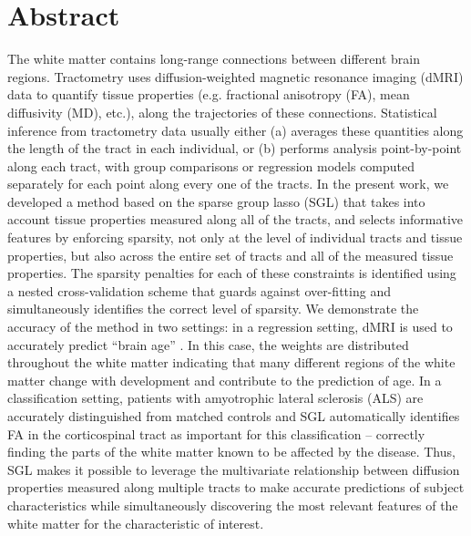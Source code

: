 \section*{Abstract}

The white matter contains long-range connections between different
brain regions. Tractometry uses diffusion-weighted magnetic resonance
imaging (dMRI) data to quantify tissue properties (e.g. fractional
anisotropy (FA), mean diffusivity (MD), etc.), along the trajectories
of these connections\cite{yeatman2012tract}. Statistical inference from
tractometry data usually either (a) averages these quantities along
the length of the tract in each individual, or (b) performs analysis
point-by-point along each tract, with group comparisons or regression
models computed separately for each point along every one of the tracts.
In the present work, we developed a method based on the sparse group
lasso (SGL) \cite{simon2013sparse} that takes into account tissue
properties measured along all of the tracts, and selects informative
features by enforcing sparsity, not only at the level of individual
tracts and tissue properties, but also across the entire set of tracts
and all of the measured tissue properties. The sparsity penalties for
each of these constraints is identified using a nested cross-validation
scheme that guards against over-fitting and simultaneously identifies
the correct level of sparsity. We demonstrate the accuracy of the method
in two settings: in a regression setting, dMRI is used to accurately
predict ``brain age'' \cite{yeatman2014lifespan, Brown2012-so}. In this
case, the weights are distributed throughout the white matter indicating
that many different regions of the white matter change with development
and contribute to the prediction of age. In a classification setting,
patients with amyotrophic lateral sclerosis (ALS) are accurately
distinguished from matched controls\cite{sarica2017corticospinal} and
SGL automatically identifies FA in the corticospinal tract as important
for this classification -- correctly finding the parts of the white
matter known to be affected by the disease. Thus, SGL makes it possible
to leverage the multivariate relationship between diffusion properties
measured along multiple tracts to make accurate predictions of subject
characteristics while simultaneously discovering the most relevant
features of the white matter for the characteristic of interest.
